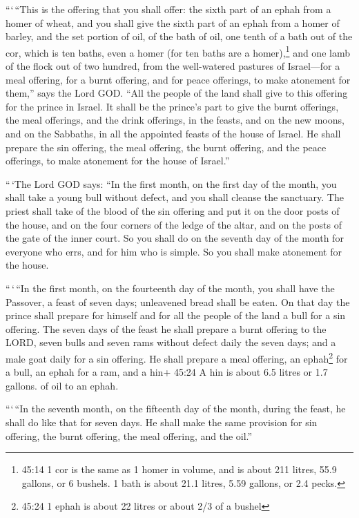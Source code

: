  ```\,``This is the offering that you shall offer: the
sixth part of an ephah from a homer of wheat, and you shall give the
sixth part of an ephah from a homer of barley,  and the set
portion of oil, of the bath of oil, one tenth of a bath out of the cor,
which is ten baths, even a homer (for ten baths are a homer),\footnote{45:14
  1 cor is the same as 1 homer in volume, and is about 211 litres, 55.9
  gallons, or 6 bushels. 1 bath is about 21.1 litres, 5.59 gallons, or
  2.4 pecks.}  and one lamb of the flock out of two
hundred, from the well-watered pastures of Israel---for a meal offering,
for a burnt offering, and for peace offerings, to make atonement for
them,'' says the Lord GOD.  ``All the people of the land
shall give to this offering for the prince in Israel.  It
shall be the prince's part to give the burnt offerings, the meal
offerings, and the drink offerings, in the feasts, and on the new moons,
and on the Sabbaths, in all the appointed feasts of the house of Israel.
He shall prepare the sin offering, the meal offering, the burnt
offering, and the peace offerings, to make atonement for the house of
Israel.''

 ``\,`The Lord GOD says: ``In the first month, on the first
day of the month, you shall take a young bull without defect, and you
shall cleanse the sanctuary.  The priest shall take of the
blood of the sin offering and put it on the door posts of the house, and
on the four corners of the ledge of the altar, and on the posts of the
gate of the inner court.  So you shall do on the seventh
day of the month for everyone who errs, and for him who is simple. So
you shall make atonement for the house.

 ``\,`\,``In the first month, on the fourteenth day of the
month, you shall have the Passover, a feast of seven days; unleavened
bread shall be eaten.  On that day the prince shall prepare
for himself and for all the people of the land a bull for a sin
offering.  The seven days of the feast he shall prepare a
burnt offering to the LORD, seven bulls and seven rams without defect
daily the seven days; and a male goat daily for a sin offering.
 He shall prepare a meal offering, an ephah\footnote{45:24
  1 ephah is about 22 litres or about 2/3 of a bushel} for a bull, an
ephah for a ram, and a hin+ 45:24 A hin is about 6.5 litres or 1.7
gallons. of oil to an ephah.

 ```\,``In the seventh month, on the fifteenth day of the
month, during the feast, he shall do like that for seven days. He shall
make the same provision for sin offering, the burnt offering, the meal
offering, and the oil.''


